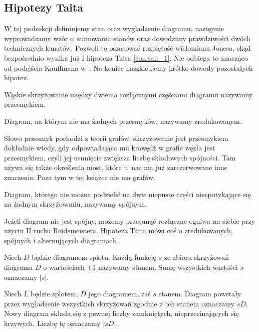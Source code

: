 
\subsection{Hipotezy Taita}
\label{sub:tait_conjectures}%
%
W tej podsekcji definiujemy stan oraz wygładzenie diagramu, następnie wyprowadzamy wzór o~sumowaniu stanów oraz dowodzimy prawdziwości dwóch technicznych lematów.
Pozwoli to oszacować rozpiętość wielomianu Jonesa, skąd bezpośrednio wynika już I hipoteza Taita \ref{con:tait_1}.
Nie odbiega to znacząco od podejścia Kauffmana w~\cite{kauffman1987}.
%
Na koniec naszkicujemy krótko dowody pozostałych hipotez.

\begin{definition}
%
%
    Wąskie skrzyżowanie między dwiema rozłącznymi częściami diagramu nazywamy przesmykiem.
\begin{comment}
    \[
        \LargeIsthmus
    \]
\end{comment}
    Diagram, na którym nie ma żadnych przesmyków, nazywamy zredukowanym.
\end{definition}

Słowo przesmyk pochodzi z teorii grafów, skrzyżowanie jest przesmykiem dokładnie wtedy, gdy odpowiadająca mu krawędź w grafie węzła jest przesmykiem, czyli jej usunięcie zwiększa liczbę składowych spójności.
Tam używa się także określenia most, które u~nas ma już zarezerwowane inne znaczenie.
Poza tym w tej książce nie ma grafów.

\begin{definition}
%
    Diagram, którego nie można podzielić na dwie niepuste części niespotykające się na żadnym skrzyżowaniu, nazywamy spójnym.
\end{definition}

Jeżeli diagram nie jest spójny, możemy przesunąć rozłączne ogniwa na siebie przy użyciu II ruchu Reidemeistera.
Hipoteza Taita mówi coś o zredukowanych, spójnych i alternujących diagramach.

\begin{definition}[stan]
%
    Niech $D$ będzie diagramem splotu.
    Każdą funkcję $s$ ze zbioru skrzyżowań diagramu $D$ o wartościach $\pm 1$ nazywamy stanem.
    Sumę wszystkich wartości $s$ oznaczamy $|s|$.
\end{definition}

\begin{definition}
%
    Niech $L$ będzie splotem, $D$ jego diagramem, zaś $s$ stanem.
    Diagram powstały przez wygładzenie wszystkich skrzyżowań zgodnie z~ich stanem oznaczamy $sD$.
    Nowy diagram składa się z pewnej liczby zamkniętych, nieprzecinających się krzywych.
    Liczbę tę oznaczamy $|sD|$.
\end{definition}

